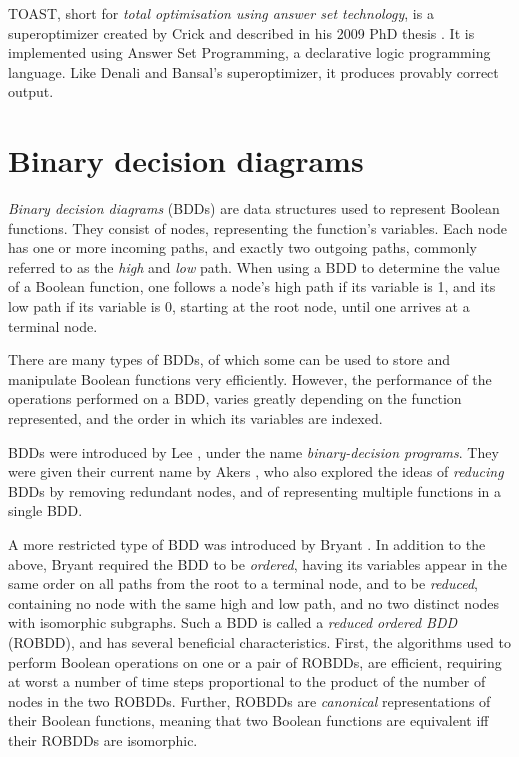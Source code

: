\documentclass[a4paper,11pt]{kth-mag}
\begin{document}
TOAST, short for \emph{total optimisation using answer set technology}, is a superoptimizer created by Crick and described in his 2009 PhD thesis \cite{crick_thesis}.
It is implemented using Answer Set Programming, a declarative logic programming language.
Like Denali and Bansal's superoptimizer, it produces provably correct output.

%

\section{Binary decision diagrams}
\label{s:bdds}

\emph{Binary decision diagrams} (BDDs) are data structures used to represent Boolean functions.
They consist of nodes, representing the function's variables. Each node has one or more incoming paths, and exactly two outgoing paths, commonly referred to as the \emph{high} and \emph{low} path.
When using a BDD to determine the value of a Boolean function, one follows a node's high path if its variable is 1, and its low path if its variable is 0, starting at the root node, until one arrives at a terminal node.

There are many types of BDDs, of which some can be used to store and manipulate Boolean functions very efficiently.
However, the performance of the operations performed on a BDD, varies greatly depending on the function represented, and the order in which its variables are indexed.

BDDs were introduced by Lee \cite{lee59}, under the name \emph{binary-decision programs}.
They were given their current name by Akers \cite{akers78}, who also explored the ideas of \emph{reducing} BDDs by removing redundant nodes, and of representing multiple functions in a single BDD.

A more restricted type of BDD was introduced by Bryant \cite{bryant86}.
In addition to the above, Bryant required the BDD to be \emph{ordered}, having its variables appear in the same order on all paths from the root to a terminal node,
and to be \emph{reduced}, containing no node with the same high and low path, and no two distinct nodes with isomorphic subgraphs.
Such a BDD is called a \emph{reduced ordered BDD} (ROBDD), and has several beneficial characteristics.
First, the algorithms used to perform Boolean operations on one or a pair of ROBDDs, are efficient, requiring at worst a number of time steps proportional to the product of the number of nodes in the two ROBDDs.
Further, ROBDDs are \emph{canonical} representations of their Boolean functions, meaning that two Boolean functions are equivalent iff their ROBDDs are isomorphic.
\end{document}
